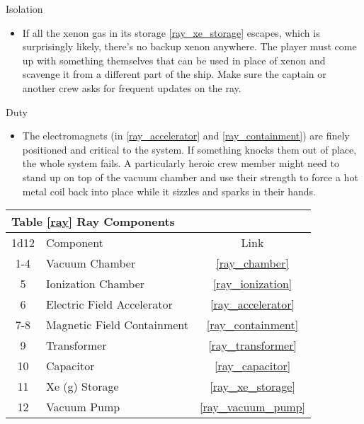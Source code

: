 \documentclass[a4paper]{article}
\begin{document}
\begin{minipage}[t]{0.4\linewidth}
Isolation
\begin{itemize}
\item If all the xenon gas in its storage \ref{ray_xe_storage} escapes, which is surprisingly likely, there's no backup xenon anywhere. The player must come up with something themselves that can be used in place of xenon and scavenge it from a different part of the ship. Make sure the captain or another crew asks for frequent updates on the ray.
\end{itemize}
\end{minipage}
\begin{minipage}[t]{0.4\linewidth}
Duty
\begin{itemize}
\item The electromagnets (in \ref{ray_accelerator} and \ref{ray_containment}) are finely positioned and critical to the system. If something knocks them out of place, the whole system fails. A particularly heroic crew member might need to stand up on top of the vacuum chamber and use their strength to force a hot metal coil back into place while it sizzles and sparks in their hands.
\end{itemize}
\end{minipage}

\vspace{0.5cm} \hspace{0.25\linewidth}
\begin{tabular}{@{} | c | l | c | @{}}
\toprule
\multicolumn{3}{|l|}{Table \ref{ray} Ray Components} \\
\toprule
1d12 & Component & Link \\
\midrule
1-4 & Vacuum Chamber & \ref{ray_chamber} \\
5 & Ionization Chamber & \ref{ray_ionization} \\
6 & Electric Field Accelerator & \ref{ray_accelerator} \\
7-8 & Magnetic Field Containment & \ref{ray_containment} \\
9 & Transformer & \ref{ray_transformer} \\
10 & Capacitor & \ref{ray_capacitor} \\
11 & Xe (g) Storage & \ref{ray_xe_storage} \\
12 & Vacuum Pump & \ref{ray_vacuum_pump} \\
\bottomrule
\end{tabular}
\end{document}
